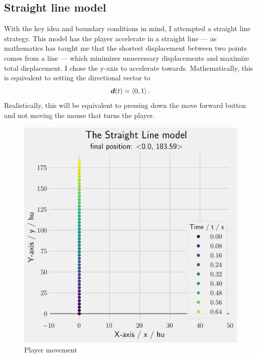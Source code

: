 \subsection{Straight line model}
With the key idea and boundary conditions in mind, I attempted a straight line strategy. This model has the player accelerate in a straight line --- as mathematics has taught me that the shortest displacement between two points comes from a line --- which minimizes unnecessary displacements and maximize total displacement. I chose the y-axis to accelerate towards. Mathematically, this is equivalent to setting the directional vector to
\[
    \boldsymbol{d}(t) = \left\langle 0, 1 \right\rangle.
\]
Realistically, this will be equivalent to pressing down the move forward button and not moving the mouse that turns the player.
\begin{figure}[H]
    \centering
     \begin{minipage}{.5\textwidth}
        \centering
        \includegraphics[width=0.9\linewidth]{assets/straight_constraint.png}
        \caption{Player movement}
        \label{fig:straight_constraint}
    \end{minipage}%
    \begin{minipage}{.5\textwidth}
        \centering

\end{minipage}
\end{figure}
